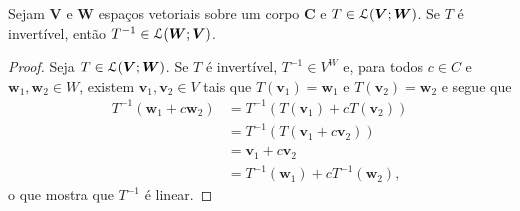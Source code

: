\begin{prop}
	Sejam $\bm V$ e $\bm W$ espaços vetoriais sobre um corpo $\bm C$ e $T \in \mathcal{L}(\bm V;\bm W)$. Se $T$ é invertível, então $T^{-1} \in \mathcal{L}(\bm W;\bm V)$.
\end{prop}
\begin{proof}
	Seja $T \in \mathcal{L}(\bm V;\bm W)$. Se $T$ é invertível, $T^{-1} \in V^W$ e, para todos $c \in C$ e $\bm w_1,\bm w_2 \in W$, existem $\bm v_1,\bm v_2 \in V$ tais que $T(\bm v_1)=\bm w_1$ e $T(\bm v_2)=\bm w_2$ e segue que
	\begin{align*}
	T^{-1}(\bm w_1+c\bm w_2)&=T^{-1}(T(\bm v_1)+cT(\bm v_2)) \\
	&= T^{-1}(T(\bm v_1+c\bm v_2)) \\
	&= \bm v_1+c\bm v_2 \\
	&= T^{-1}(\bm w_1)+cT^{-1}(\bm w_2),
	\end{align*}
o que mostra que $T^{-1}$ é linear.
\end{proof}

